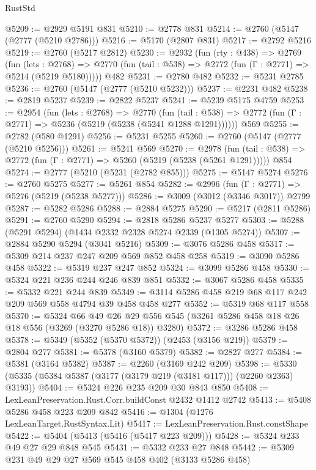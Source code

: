 \begin{lexlean}{RustStd}
\begin{coremodule}
@5209 := @2929 @5191 @831
@5210 := @2778 @831
@5214 := @2760 (@5147 (@2777 (@5210 @2786)))
@5216 := @5170 (@2807 @831)
@5217 := @2792 @5216
@5219 := @2760 (@5217 @2812)
@5230 := @2932
    (fun (rty : @438) =>
    @2769
      (fun (lets : @2768) =>
      @2770 (fun (tail : @538) => @2772 (fun (Γ : @2771) => @5214 (@5219 @5180)))))
    @482
@5231 := @2780 @482
@5232 := @5231 @2785
@5236 := @2760 (@5147 (@2777 (@5210 @5232)))
@5237 := @2231 @482
@5238 := @2819 @5237
@5239 := @2822 @5237
@5241 := @5239 @5175 @4759
@5253 := @2954
    (fun (lets : @2768) =>
    @2770
      (fun (tail : @538) => @2772 (fun (Γ : @2771) => @5236 (@5219 (@5238 (@5241 @1288 @1291))))))
    @569
@5255 := @2782 (@580 @1291)
@5256 := @5231 @5255
@5260 := @2760 (@5147 (@2777 (@5210 @5256)))
@5261 := @5241 @569
@5270 := @2978
    (fun (tail : @538) => @2772 (fun (Γ : @2771) => @5260 (@5219 (@5238 (@5261 @1291)))))
    @854
@5274 := @2777 (@5210 (@5231 (@2782 @855)))
@5275 := @5147 @5274
@5276 := @2760 @5275
@5277 := @5261 @854
@5282 := @2996 (fun (Γ : @2771) => @5276 (@5219 (@5238 @5277)))
@5286 := @3009 (@3012 (@3346 @3017)) @2799
@5287 := @5282 @5286
@5288 := @2884 @5275
@5290 := @5217 (@2811 @5286)
@5291 := @2760 @5290
@5294 := @2818 @5286 @5237 @5277
@5303 := @5288 (@5291 @5294) (@1434 @2332 @2328 @5274 @2339 (@1305 @5274))
@5307 := @2884 @5290 @5294 (@3041 @5216)
@5309 := @3076 @5286 @458
@5317 := @5309 @214 @237 @247 @209 @569 @852 @458 @258
@5319 := @3090 @5286 @458
@5322 := @5319 @237 @247 @852
@5324 := @3099 @5286 @458
@5330 := @5324 @221 @236 @244 @246 @839 @851
@5332 := @3067 @5286 @458
@5335 := @5332 @221 @244 @839
@5349 := @3114 @5286 @458 @219 @68 @117 @242 @209 @569 @558 @4794 @39 @458 @458 @277
@5352 := @5319 @68 @117 @558
@5370 := @5324
    @66
    @49
    @26
    @29
    @556
    @545
    (@3261 @5286 @458 @18 @26 @18 @556 (@3269 (@3270 @5286 @18)) @3280)
@5372 := @3286 @5286 @458
@5378 := @5349 (@5352 (@5370 @5372)) (@2453 (@3156 @219))
@5379 := @2804 @277
@5381 := @5378 (@3160 @5379)
@5382 := @2827 @277
@5384 := @5381 (@3164 @5382)
@5387 := @2260 (@3169 @242 @209)
@5398 := @5330 (@5335 (@5384 @5387 (@3177 (@3179 @219 (@3181 @117))) (@2260 @2363) @3193))
@5404 := @5324 @226 @235 @209 @30 @843 @850
@5408 := LexLeanPreservation.Rust.Corr.buildConst @2432 @1412 @2742
@5413 := @5408 @5286 @458 @223 @209 @842
@5416 := @1304 (@1276 LexLeanTarget.RustSyntax.Lit)
@5417 := LexLeanPreservation.Rust.constShape
@5422 := @5404 (@5413 (@5416 (@5417 @223 @209)))
@5428 := @5324 @233 @49 @27 @29 @848 @545
@5431 := @5332 @233 @27 @848
@5442 := @5309 @231 @49 @29 @27 @569 @545 @458 @402 (@3133 @5286 @458)

\end{coremodule}
\end{lexlean}
